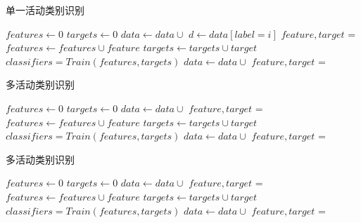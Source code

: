 \documentclass[11pt]{ctexart}
\begin{document}
    \begin{algorithm}
        \caption{单一活动类别识别}
        \begin{algorithmic}[1] %
            	\State $features \gets 0$
                \State $targets \gets 0$
                		\State $data \gets data \cup $
				\State $d \gets data[label=i]$
				\State $feature,target$ = 
				\State $features \gets features \cup feature$
				\State $targets \gets targets \cup target$
			\EndFor
		\EndFor
		\State $classifiers = Train(features,targets)$
                		\State $data \gets data \cup $
				\State $feature,target$ = 
				\State {}
			\EndFor
		\EndFor
            \EndFunction    
        \end{algorithmic}
    \end{algorithm}

\begin{algorithm}
        \caption{多活动类别识别}
        \begin{algorithmic}[1] %
	        \State $features \gets 0$
                \State $targets \gets 0$
                		\State $data \gets data \cup $
				\State $feature,target$ = 
				\State $features \gets features \cup feature$
				\State $targets \gets targets \cup target$
		\EndFor
		\State $classifiers = Train(features,targets)$
                		\State $data \gets data \cup $
				\State $feature,target$ = 
				\State {}
		\EndFor
            \EndFunction    
        \end{algorithmic}
    \end{algorithm}
    
    \begin{algorithm}
        \caption{多活动类别识别}
        \begin{algorithmic}[1] %
	        \State $features \gets 0$
                \State $targets \gets 0$
                		\State $data \gets data \cup $
				\State $feature,target$ = 
				\State $features \gets features \cup feature$
				\State $targets \gets targets \cup target$
		\EndFor
		\State $classifiers = Train(features,targets)$
                		\State $data \gets data \cup $
				\State $feature,target$ = 
				\State {}
		\EndFor
            \EndFunction    
        \end{algorithmic}
    \end{algorithm}
    
\end{document}
